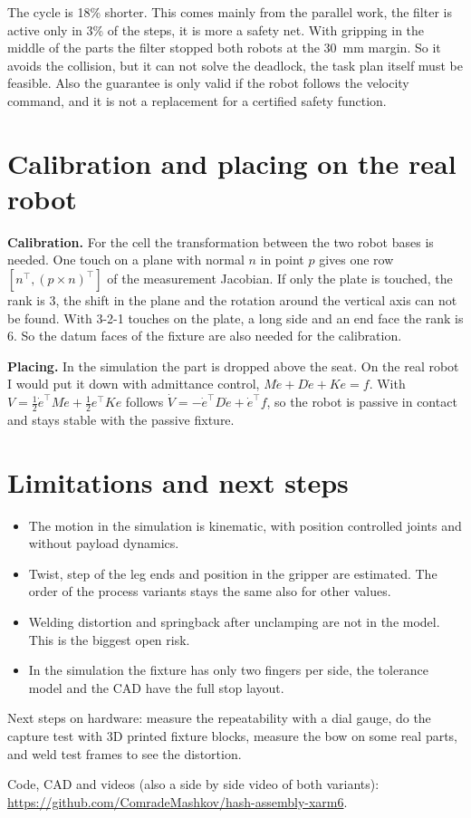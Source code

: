 \documentclass[11pt,a4paper]{article}
\begin{document}
The cycle is 18\% shorter. This comes mainly from the parallel work, the filter is active only in 3\% of the steps, it is more a safety net. With gripping in the middle of the parts the filter stopped both robots at the 30~mm margin. So it avoids the collision, but it can not solve the deadlock, the task plan itself must be feasible. Also the guarantee is only valid if the robot follows the velocity command, and it is not a replacement for a certified safety function.

\section{Calibration and placing on the real robot}
\textbf{Calibration.} For the cell the transformation between the two robot bases is needed. One touch on a plane with normal $n$ in point $p$ gives one row $[n^\top, (p\times n)^\top]$ of the measurement Jacobian. If only the plate is touched, the rank is 3, the shift in the plane and the rotation around the vertical axis can not be found. With 3-2-1 touches on the plate, a long side and an end face the rank is 6. So the datum faces of the fixture are also needed for the calibration.

\textbf{Placing.} In the simulation the part is dropped above the seat. On the real robot I would put it down with admittance control, $M\ddot e + D\dot e + Ke = f$. With $V = \frac12 \dot e^\top M \dot e + \frac12 e^\top K e$ follows $\dot V = -\dot e^\top D \dot e + \dot e^\top f$, so the robot is passive in contact and stays stable with the passive fixture.

\section{Limitations and next steps}
\begin{itemize}
\item The motion in the simulation is kinematic, with position controlled joints and without payload dynamics.
\item Twist, step of the leg ends and position in the gripper are estimated. The order of the process variants stays the same also for other values.
\item Welding distortion and springback after unclamping are not in the model. This is the biggest open risk.
\item In the simulation the fixture has only two fingers per side, the tolerance model and the CAD have the full stop layout.
\end{itemize}

Next steps on hardware: measure the repeatability with a dial gauge, do the capture test with 3D printed fixture blocks, measure the bow on some real parts, and weld test frames to see the distortion.

Code, CAD and videos (also a side by side video of both variants): \url{https://github.com/ComradeMashkov/hash-assembly-xarm6}.
\end{document}
